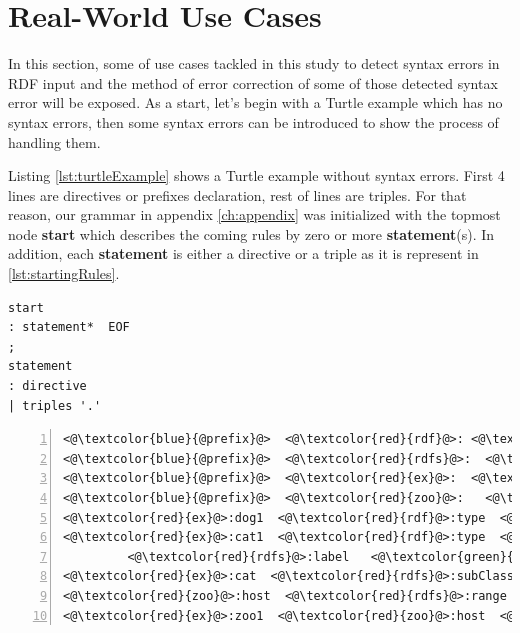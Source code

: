 \vspace{-5mm}

\section{Real-World Use Cases}
In this section, some of use cases tackled in this study to detect syntax errors in RDF input and  the method of error correction of some of those detected syntax error will be exposed. As a start, let's begin with a Turtle example which has no syntax errors, then some syntax errors can be introduced to show the process of handling them. 
	\vspace{5mm} %

Listing \ref{lst:turtleExample} shows a Turtle example without syntax errors. First 4 lines are directives or prefixes declaration, rest of lines are triples.  For that reason, our grammar in appendix \ref{ch:appendix} was initialized with the topmost node \textbf{start}  which describes the coming rules by zero or more  \textbf{statement}(s). In addition, each \textbf{statement} is either a directive or a triple as it is represent in \ref{lst:startingRules}.

\begin{lstlisting}[label=lst:startingRules, caption={Starting rules in the grammar file}] 
start
: statement*  EOF
;
statement
: directive
| triples '.'
\end{lstlisting}

\begin{lstlisting}[label=lst:turtleExample, numbers=left, caption={RDF example in Turtle serialization format}]
<@\textcolor{blue}{@prefix}@>  <@\textcolor{red}{rdf}@>: <@\textcolor{orange}{<http://www.w3.org/1999/02/22-rdf-syntax-ns#>}@> .
<@\textcolor{blue}{@prefix}@>  <@\textcolor{red}{rdfs}@>:  <@\textcolor{orange}{<http://www.w3.org/2000/01/rdf-schema#>}@> .
<@\textcolor{blue}{@prefix}@>  <@\textcolor{red}{ex}@>:  <@\textcolor{orange}{<http://example.org/>}@> .
<@\textcolor{blue}{@prefix}@>  <@\textcolor{red}{zoo}@>:   <@\textcolor{orange}{<http://example.org/zoo/> }@> .
<@\textcolor{red}{ex}@>:dog1  <@\textcolor{red}{rdf}@>:type  <@\textcolor{red}{ex}@>:animal .
<@\textcolor{red}{ex}@>:cat1  <@\textcolor{red}{rdf}@>:type  <@\textcolor{red}{ex}@>:cat ;
         <@\textcolor{red}{rdfs}@>:label   <@\textcolor{green}{"Lusi"@en}@> .
<@\textcolor{red}{ex}@>:cat  <@\textcolor{red}{rdfs}@>:subClassOf  <@\textcolor{red}{ex}@>:animal .
<@\textcolor{red}{zoo}@>:host  <@\textcolor{red}{rdfs}@>:range  <@\textcolor{red}{ex}@>:animal .
<@\textcolor{red}{ex}@>:zoo1  <@\textcolor{red}{zoo}@>:host  <@\textcolor{red}{ex}@>:cat2 .
\end{lstlisting}



